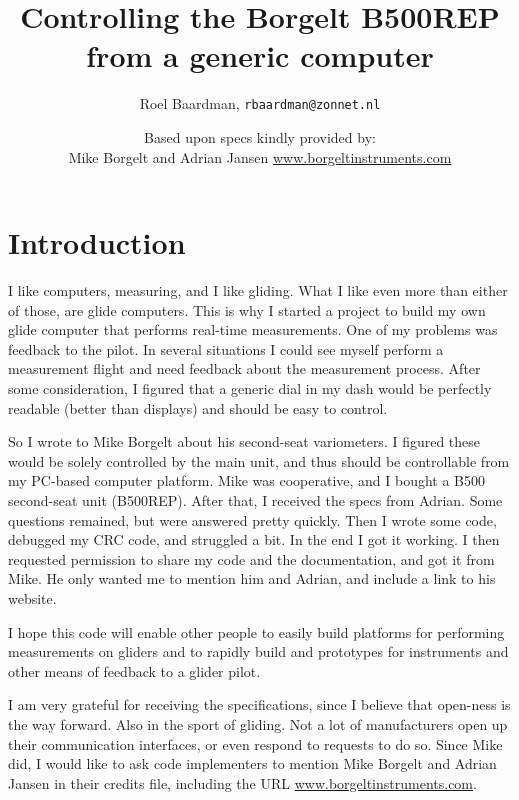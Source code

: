 \documentclass{article}
\begin{document}
\title{Controlling the Borgelt B500REP from a generic computer}
\author{Roel Baardman, \nolinkurl{rbaardman@zonnet.nl}}
\date{Based upon specs kindly provided by: \\ Mike Borgelt and Adrian Jansen  \url{www.borgeltinstruments.com}}
\maketitle

\newpage

\tableofcontents

\newpage
\section{Introduction}
I like computers, measuring, and I like gliding. What I like even more than either of those, are glide computers. This is why I started a project to build my own glide computer that performs real-time measurements. One of my problems was feedback to the pilot. In several situations I could see myself perform a measurement flight and need feedback about the measurement process. After some consideration, I figured that a generic dial in my dash would be perfectly readable (better than displays) and should be easy to control.

So I wrote to Mike Borgelt about his second-seat variometers. I figured these would be solely controlled by the main unit, and thus should be controllable from my PC-based computer platform. Mike was cooperative, and I bought a B500 second-seat unit (B500REP). After that, I received the specs from Adrian. Some questions remained, but were answered pretty quickly. Then I wrote some code, debugged my CRC code, and struggled a bit. In the end I got it working. I then requested permission to share my code and the documentation, and got it from Mike. He only wanted me to mention him and Adrian, and include a link to his website.

I hope this code will enable other people to easily build platforms for performing measurements on gliders and to rapidly build and prototypes for instruments and other means of feedback to a glider pilot.

I am very grateful for receiving the specifications, since I believe that open-ness is the way forward. Also in the sport of gliding. Not a lot of manufacturers open up their communication interfaces, or even respond to requests to do so. Since Mike did, I would like to ask code implementers to mention Mike Borgelt and Adrian Jansen in their credits file, including the URL \url{www.borgeltinstruments.com}.
\end{document}
